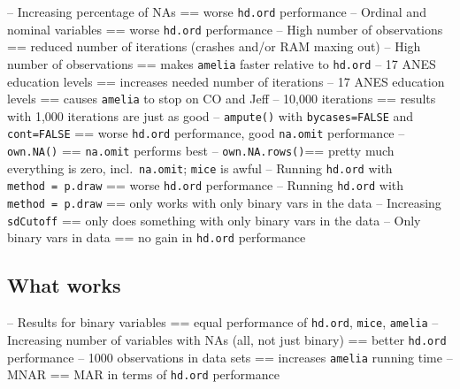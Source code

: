 \documentclass[12pt,econ]{sources/authesis}
\begin{document}
-- Increasing percentage of NAs == worse \texttt{hd.ord} performance
-- Ordinal and nominal variables == worse \texttt{hd.ord} performance
-- High number of observations == reduced number of iterations (crashes and/or RAM maxing out)
-- High number of observations == makes \texttt{amelia} faster relative to \texttt{hd.ord}
-- 17 ANES education levels == increases needed number of iterations
-- 17 ANES education levels == causes \texttt{amelia} to stop on CO and Jeff
-- 10,000 iterations == results with 1,000 iterations are just as good
-- \texttt{ampute()} with \texttt{bycases=FALSE} and \texttt{cont=FALSE} == worse \texttt{hd.ord} performance, good \texttt{na.omit} performance
-- \texttt{own.NA()} == \texttt{na.omit} performs best
-- \texttt{own.NA.rows()}== pretty much everything is zero, incl.~\texttt{na.omit}; \texttt{mice} is awful
-- Running \texttt{hd.ord} with \texttt{method\ =\ p.draw} == worse \texttt{hd.ord} performance
-- Running \texttt{hd.ord} with \texttt{method\ =\ p.draw} == only works with only binary vars in the data
-- Increasing \texttt{sdCutoff} == only does something with only binary vars in the data
-- Only binary vars in data == no gain in \texttt{hd.ord} performance

\hypertarget{what-works}{%
\subsection{What works}\label{what-works}}

-- Results for binary variables == equal performance of \texttt{hd.ord}, \texttt{mice}, \texttt{amelia}
-- Increasing number of variables with NAs (all, not just binary) == better \texttt{hd.ord} performance
-- 1000 observations in data sets == increases \texttt{amelia} running time
-- MNAR == MAR in terms of \texttt{hd.ord} performance
\end{document}

